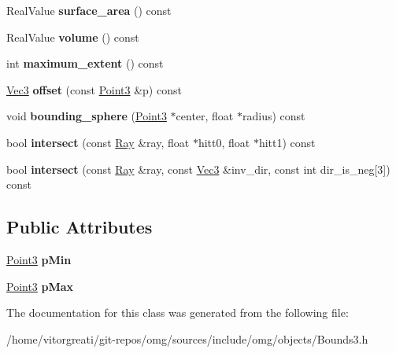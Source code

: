 \begin{DoxyCompactItemize}
Real\+Value {\bfseries surface\+\_\+area} () const
\item 
\mbox{\label{classomg_1_1_bounds3_ac5df1e7d717da90fe8bb10cbe858a892}} 
Real\+Value {\bfseries volume} () const
\item 
\mbox{\label{classomg_1_1_bounds3_a02fe90c43be415be2cd29b4d503e0ec8}} 
int {\bfseries maximum\+\_\+extent} () const
\item 
\mbox{\label{classomg_1_1_bounds3_aeef6c693085f4a8f59b1711c9341a15d}} 
\mbox{\hyperlink{namespaceomg_a45a9482677fee9933ff369b49894e316}{Vec3}} {\bfseries offset} (const \mbox{\hyperlink{namespaceomg_af85242d35fdacf829d32a6f9b95f3e35}{Point3}} \&p) const
\item 
\mbox{\label{classomg_1_1_bounds3_afc7671ef48879ef8405e1105fe2e50d6}} 
void {\bfseries bounding\+\_\+sphere} (\mbox{\hyperlink{namespaceomg_af85242d35fdacf829d32a6f9b95f3e35}{Point3}} $\ast$center, float $\ast$radius) const
\item 
\mbox{\label{classomg_1_1_bounds3_a6cc1f531009d8448ddfb39615a24ca27}} 
bool {\bfseries intersect} (const \mbox{\hyperlink{classomg_1_1_ray}{Ray}} \&ray, float $\ast$hitt0, float $\ast$hitt1) const
\item 
\mbox{\label{classomg_1_1_bounds3_a3f8fea1a411dbe41d1e4a96ed99bbe29}} 
bool {\bfseries intersect} (const \mbox{\hyperlink{classomg_1_1_ray}{Ray}} \&ray, const \mbox{\hyperlink{namespaceomg_a45a9482677fee9933ff369b49894e316}{Vec3}} \&inv\+\_\+dir, const int dir\+\_\+is\+\_\+neg\mbox{[}3\mbox{]}) const
\end{DoxyCompactItemize}
\subsection*{Public Attributes}
\begin{DoxyCompactItemize}
\item 
\mbox{\label{classomg_1_1_bounds3_a6ccd4b172b8daa976fb75d9864934977}} 
\mbox{\hyperlink{namespaceomg_af85242d35fdacf829d32a6f9b95f3e35}{Point3}} {\bfseries p\+Min}
\item 
\mbox{\label{classomg_1_1_bounds3_a9cda721148a1a768eeb906df14fc41b2}} 
\mbox{\hyperlink{namespaceomg_af85242d35fdacf829d32a6f9b95f3e35}{Point3}} {\bfseries p\+Max}
\end{DoxyCompactItemize}


The documentation for this class was generated from the following file\+:\begin{DoxyCompactItemize}
\item 
/home/vitorgreati/git-\/repos/omg/sources/include/omg/objects/Bounds3.\+h\end{DoxyCompactItemize}
